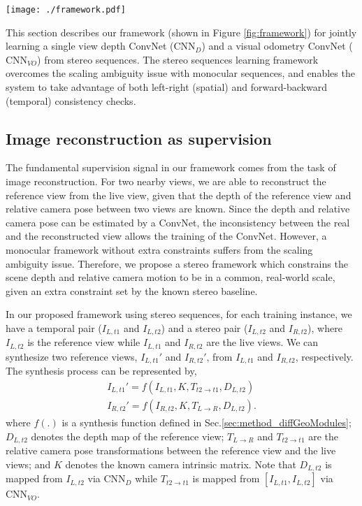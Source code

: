 \documentclass[10pt,twocolumn,letterpaper]{article}
\begin{document}
\begin{figure*}[h] 
\centering
    \texttt{[image: ./framework.pdf]}
    \caption{Illustration of our proposed framework in training phase. $\text{CNN}_{VO}$ and $\text{CNN}_D$ can be used independently in testing phase. }\label{fig:framework}
\end{figure*}

This section describes our framework (shown in Figure \ref{fig:framework}) for jointly learning a single view depth ConvNet ($\text{CNN}_{D}$) and a visual odometry ConvNet ($\text{CNN}_{VO}$) from stereo sequences. The stereo sequences learning framework overcomes the scaling ambiguity issue with monocular sequences, and enables the system to take advantage of both left-right (spatial) and forward-backward (temporal) consistency checks. 

\subsection{Image reconstruction as supervision} \label{sec:method_imgSuper}
The fundamental supervision signal in our framework comes from the task of image reconstruction. For two nearby views, we are able to reconstruct the reference view from the live view, given that the depth of the reference view and relative camera pose between two views are known. 
Since the depth and relative camera pose can be estimated by a ConvNet, the inconsistency between the real and the reconstructed view allows the training of the ConvNet. 
However, a monocular framework without extra constraints \cite{zhou2017sfmlearner} suffers from the scaling ambiguity issue. Therefore, we propose a stereo framework which constrains the scene depth and relative camera motion to be in a common, real-world scale, given an extra constraint set by the known stereo baseline.

In our proposed framework using stereo sequences, for each training instance, we have a temporal pair ($I_{L,t1}$ and $I_{L,t2}$) and a stereo pair ($I_{L,t2}$ and $I_{R,t2}$), where $I_{L,t2}$ is the reference view while $I_{L,t1}$ and $I_{R,t2}$ are the live views. We can synthesize two reference views, $I_{L,t1}'$ and $I_{R,t2}'$, from $I_{L,t1}$ and $I_{R,t2}$, respectively. The synthesis process can be represented by, 
\begin{align}
    I_{L,t1}' = f(I_{L,t1}, K, T_{t2 \rightarrow t1}, D_{L,t2}) \label{eqn:synImg1} \\
    I_{R,t2}' = f(I_{R,t2}, K, T_{L \rightarrow R}, D_{L,t2}). \label{eqn:synImg2}
\end{align}
\noindent where $f(.)$ is a synthesis function defined in Sec.\ref{sec:method_diffGeoModules}; 
$D_{L,t2}$ denotes the depth map of the reference view; 
$T_{L \rightarrow R}$ and $T_{t2 \rightarrow t1}$ are the relative camera pose transformations between the reference view and the live views; 
and $K$ denotes the known camera intrinsic matrix. Note that $D_{L,t2}$ is mapped from $I_{L,t2}$ via $\text{CNN}_{D}$ 
while $T_{t2 \rightarrow t1}$ is mapped from $[I_{L,t1}, I_{L,t2}]$ via $\text{CNN}_{VO}$. 
\end{document}

